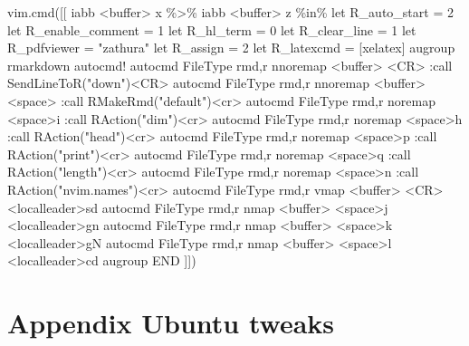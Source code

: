 \documentclass[
  letterpaper,
  DIV=11,
  numbers=noendperiod,
  oneside]{scrartcl}
\newenvironment{Shaded}{\begin{snugshade}}{\end{snugshade}}
\newcommand{\BuiltInTok}[1]{\textcolor[rgb]{0.00,0.23,0.31}{#1}}
\newcommand{\DecValTok}[1]{\textcolor[rgb]{0.68,0.00,0.00}{#1}}
\newcommand{\ErrorTok}[1]{\textcolor[rgb]{0.68,0.00,0.00}{#1}}
\newcommand{\ExtensionTok}[1]{\textcolor[rgb]{0.00,0.23,0.31}{#1}}
\newcommand{\KeywordTok}[1]{\textcolor[rgb]{0.00,0.23,0.31}{#1}}
\newcommand{\NormalTok}[1]{\textcolor[rgb]{0.00,0.23,0.31}{#1}}
\newcommand{\OperatorTok}[1]{\textcolor[rgb]{0.37,0.37,0.37}{#1}}
\newcommand{\OtherTok}[1]{\textcolor[rgb]{0.00,0.23,0.31}{#1}}
\newcommand{\StringTok}[1]{\textcolor[rgb]{0.13,0.47,0.30}{#1}}
\newcommand{\VariableTok}[1]{\textcolor[rgb]{0.07,0.07,0.07}{#1}}
\begin{document}
\begin{Shaded}
\begin{Highlighting}[]






\ExtensionTok{vim.cmd}\ErrorTok{(}\KeywordTok{[[}
\NormalTok{iabb }\OtherTok{\textless{}}\NormalTok{buffer}\ErrorTok{\textgreater{}} \ErrorTok{x} \ExtensionTok{\%}\OperatorTok{\textgreater{}}\NormalTok{\%}
\ExtensionTok{iabb} \OperatorTok{\textless{}}\NormalTok{buffer}\OperatorTok{\textgreater{}}\NormalTok{ z \%in\% }
\BuiltInTok{let} \VariableTok{R\_auto\_start} \OperatorTok{=} \DecValTok{2}
\BuiltInTok{let} \VariableTok{R\_enable\_comment} \OperatorTok{=} \DecValTok{1}
\BuiltInTok{let} \VariableTok{R\_hl\_term} \OperatorTok{=} \DecValTok{0}
\BuiltInTok{let} \VariableTok{R\_clear\_line} \OperatorTok{=} \DecValTok{1}
\BuiltInTok{let} \VariableTok{R\_pdfviewer} \OperatorTok{=} \StringTok{"zathura"} 
\BuiltInTok{let} \VariableTok{R\_assign} \OperatorTok{=} \DecValTok{2}
\BuiltInTok{let} \VariableTok{R\_latexcmd} \OperatorTok{=} \OperatorTok{[}\StringTok{\textquotesingle{}xelatex\textquotesingle{}}\OperatorTok{]}
\ExtensionTok{augroup}\NormalTok{ rmarkdown}
\ExtensionTok{autocmd!}
\ExtensionTok{autocmd}\NormalTok{ FileType rmd,r nnoremap }\OperatorTok{\textless{}}\NormalTok{buffer}\OperatorTok{\textgreater{}} \OperatorTok{\textless{}}\NormalTok{CR}\OperatorTok{\textgreater{}}\NormalTok{  :call SendLineToR}\ErrorTok{(}\StringTok{"down"}\KeywordTok{)}\OperatorTok{\textless{}}\NormalTok{CR}\OperatorTok{\textgreater{}}
\ExtensionTok{autocmd}\NormalTok{ FileType rmd,r nnoremap }\OperatorTok{\textless{}}\NormalTok{buffer}\OperatorTok{\textgreater{}} \OperatorTok{\textless{}}\NormalTok{space}\OperatorTok{\textgreater{}}\StringTok{\textquotesingle{} :call RMakeRmd("default")\textless{}cr\textgreater{}}
\StringTok{autocmd FileType rmd,r noremap \textless{}space\textgreater{}i :call RAction("dim")\textless{}cr\textgreater{}}
\StringTok{autocmd FileType rmd,r noremap \textless{}space\textgreater{}h :call RAction("head")\textless{}cr\textgreater{}}
\StringTok{autocmd FileType rmd,r noremap \textless{}space\textgreater{}p :call RAction("print")\textless{}cr\textgreater{}}
\StringTok{autocmd FileType rmd,r noremap \textless{}space\textgreater{}q :call RAction("length")\textless{}cr\textgreater{}}
\StringTok{autocmd FileType rmd,r noremap \textless{}space\textgreater{}n :call RAction("nvim.names")\textless{}cr\textgreater{}}
\StringTok{autocmd FileType rmd,r vmap \textless{}buffer\textgreater{} \textless{}CR\textgreater{} \textless{}localleader\textgreater{}sd}
\StringTok{autocmd FileType rmd,r nmap \textless{}buffer\textgreater{} \textless{}space\textgreater{}j \textless{}localleader\textgreater{}gn}
\StringTok{autocmd FileType rmd,r nmap \textless{}buffer\textgreater{} \textless{}space\textgreater{}k \textless{}localleader\textgreater{}gN}
\StringTok{autocmd FileType rmd,r nmap \textless{}buffer\textgreater{} \textless{}space\textgreater{}l \textless{}localleader\textgreater{}cd}
\StringTok{augroup END}
\StringTok{]])}






\end{Highlighting}
\end{Shaded}

\section{Appendix Ubuntu tweaks}\label{appendix-ubuntu-tweaks}
\end{document}
